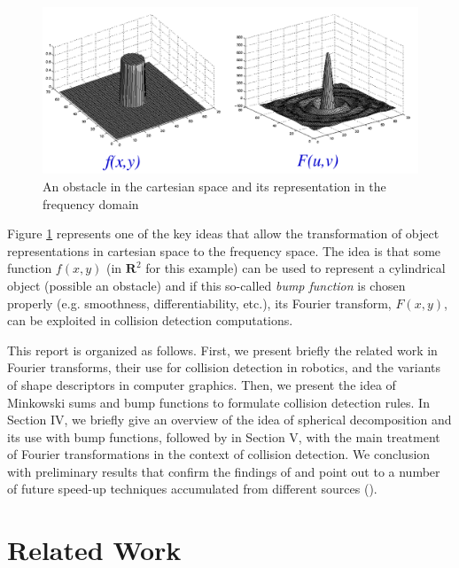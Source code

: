 \documentclass[letterpaper, 10 pt, conference]{ieeeconf}
\begin{document}
\begin{figure}[ht!] 
  \centering
  \includegraphics[width=1.0\linewidth]{Figures/main.png}
  \caption{An obstacle in the cartesian space and its representation in the frequency domain}
  \label{fig:main}
\end{figure}

Figure \ref{fig:main} represents one of the key ideas that allow the transformation of object representations
in cartesian space to the frequency space. The idea is that some function $f(x,y)$ (in $\mathbf{R}^2$ for
this example) can be used to represent a cylindrical object (possible an obstacle) and if this so-called
\textit{bump function} is chosen properly (e.g. smoothness, differentiability, etc.), its Fourier transform,
$F(x,y)$, can be exploited in collision detection computations.

This report is organized as follows. First, we present briefly the related work in Fourier transforms,
their use for collision detection in robotics, and the variants of shape descriptors in computer graphics.
Then, we present the idea of Minkowski sums and bump functions to formulate collision detection
rules. In Section IV, we briefly give an overview of the idea of spherical decomposition and its use 
with bump functions, followed by in Section V, with the main treatment of Fourier transformations in
the context of collision detection. We conclusion with preliminary results that confirm the 
findings of \cite{behandish2016analytic} and point out to a number of future speed-up techniques
accumulated from different sources (\cite{behandish2016analytic, kavraki1995computation, lysenko2013fourier}).

\section{Related Work}
\end{document}
